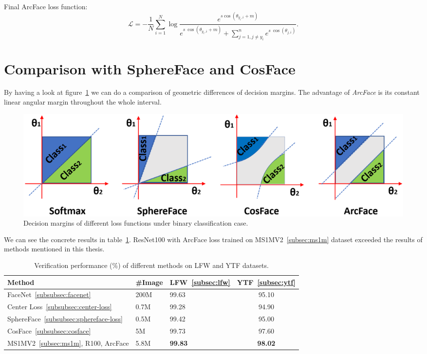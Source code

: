 Final ArcFace loss function:
\begin{equation}
    \mathcal{L} = -\frac{1}{N} \sum_{i=1}^{N} \log \frac{e^{s \cos(\theta_{y_i,i} + m)}}
    {e^{s\ \cos(\theta_{y_i,i} + m)} + \sum_{j = 1, j \neq y_i}^n e^{s\ \cos(\theta_{j,i})}}.
\end{equation}

\section{Comparison with SphereFace and CosFace}\label{sec:arc-comparison}
By having a look at figure~\ref{fig:arcfacecomp} we can do a comparison of geometric differences of decision margins.
The advantage of \textit{ArcFace} is its constant linear angular margin throughout the whole interval.

\begin{figure}[H]
    \centering
    \includegraphics[width=\columnwidth]{images/arcface/arcfacecomparison.png}
    \caption{Decision margins of different loss functions under binary classification case.~\cite{ArcFace}}
    \label{fig:arcfacecomp}
\end{figure}

We can see the concrete results in table~\ref{tbl:arcfacecomp}.
ResNet100 with ArcFace loss trained on MS1MV2~\ref{subsec:ms1m} dataset exceeded the results of methods mentioned in
this thesis.

\begin{table}[H]
    \begin{tabularx}{\textwidth}{l|XXc}
        Method                & \#Image & LFW~\ref{subsec:lfw}            & YTF~\ref{subsec:ytf}            \\ \hline
        FaceNet~\ref{subsubsec:facenet}               & 200M    & 99.63          & 95.10          \\
        Center Loss~\ref{subsubsec:center-loss}           & 0.7M    & 99.28          & 94.90          \\
        SphereFace~\ref{subsubsec:sphereface-loss}            & 0.5M    & 99.42          & 95.00          \\
        CosFace~\ref{subsubsec:cosface}               & 5M      & 99.73          & 97.60          \\
        MS1MV2~\ref{subsec:ms1m}, R100, ArcFace & 5.8M    & \textbf{99.83} & \textbf{98.02}
    \end{tabularx}
    \caption{Verification performance (\%) of different methods on LFW and YTF datasets.}
    \label{tbl:arcfacecomp}
\end{table}